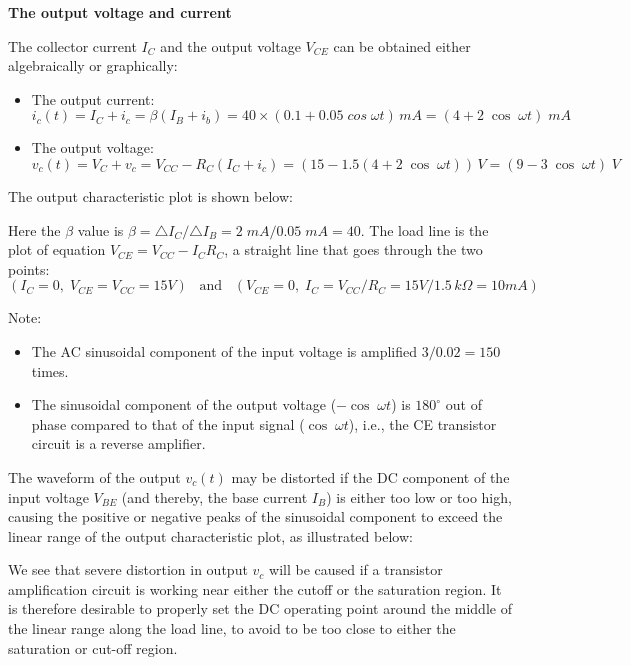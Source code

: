 {\bf The output voltage and current}

The collector current $I_C$ and the output voltage $V_{CE}$ can be obtained
either algebraically or graphically:

\begin{itemize}
\item The output current:
  \[
  i_c(t)=I_C+i_c=\beta (I_B+i_b)=40\times (0.1+0.05\; cos\;\omega t)\,mA
  =(4 + 2\;\cos\;\omega t) \; mA 
  \]
\item The output voltage:
  \[
  v_c(t)=V_C+v_c=V_{CC}-R_C(I_C+i_c)=(15-1.5 (4 + 2\;\cos\;\omega t ))\,V
  =(9-3\;\cos\;\omega t) \; V  
  \]
\end{itemize}

The output characteristic plot is shown below:


Here the $\beta$ value is $\beta=\triangle I_C/\triangle I_B=2\;mA/0.05\;mA=40$.
The load line is the plot of equation $V_{CE}=V_{CC}-I_C R_C$, a straight line 
that goes through the two points:
\[ 
(I_C=0,\;V_{CE}=V_{CC}=15V) \;\;\;\mbox{and}\;\;\;
(V_{CE}=0,\;I_C=V_{CC}/R_C=15V/1.5\,k\Omega=10 mA) 
\]


Note:
\begin{itemize}
\item The AC sinusoidal component of the input voltage is amplified
  $3/0.02=150$ times.
\item The sinusoidal component of the output voltage ($-\cos\;\omega t$)
  is $180^\circ$ out of phase compared to that of the input signal 
  ($\cos\;\omega t$), i.e., the CE transistor circuit is a reverse amplifier.
\end{itemize}

The waveform of the output $v_c(t)$ may be distorted if the DC component of 
the input voltage $V_{BE}$ (and thereby, the base current $I_B$) is either too 
low or too high, causing the positive or negative peaks of the sinusoidal 
component to exceed the linear range of the output characteristic plot, as 
illustrated below:



We see that severe distortion in output $v_c$ will be caused if a transistor 
amplification circuit is working near either the cutoff or the saturation 
region. It is therefore desirable to properly set the DC operating point 
around the middle of the linear range along the load line, to avoid to be
too close to either the saturation or cut-off region.

